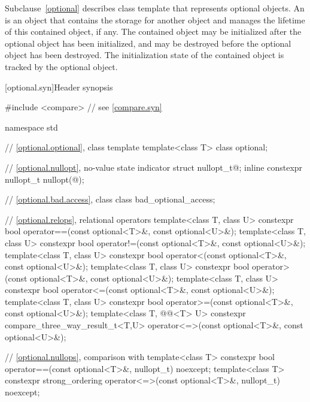 \pnum
Subclause~\ref{optional} describes class template  that represents
optional objects.
An  is an
object that contains the storage for another object and manages the lifetime of
this contained object, if any. The contained object may be initialized after
the optional object has been initialized, and may be destroyed before the
optional object has been destroyed. The initialization state of the contained
object is tracked by the optional object.

[optional.syn]{Header  synopsis}

%
\begin{codeblock}
#include <compare>              // see \ref{compare.syn}

namespace std {
  // \ref{optional.optional}, class template 
  template<class T>
    class optional;

  // \ref{optional.nullopt}, no-value state indicator
  struct nullopt_t{@\seebelow@};
  inline constexpr nullopt_t nullopt(@\unspec@);

  // \ref{optional.bad.access}, class 
  class bad_optional_access;

  // \ref{optional.relops}, relational operators
  template<class T, class U>
    constexpr bool operator==(const optional<T>&, const optional<U>&);
  template<class T, class U>
    constexpr bool operator!=(const optional<T>&, const optional<U>&);
  template<class T, class U>
    constexpr bool operator<(const optional<T>&, const optional<U>&);
  template<class T, class U>
    constexpr bool operator>(const optional<T>&, const optional<U>&);
  template<class T, class U>
    constexpr bool operator<=(const optional<T>&, const optional<U>&);
  template<class T, class U>
    constexpr bool operator>=(const optional<T>&, const optional<U>&);
  template<class T, @@<T> U>
    constexpr compare_three_way_result_t<T,U>
      operator<=>(const optional<T>&, const optional<U>&);

  // \ref{optional.nullops}, comparison with 
  template<class T> constexpr bool operator==(const optional<T>&, nullopt_t) noexcept;
  template<class T>
    constexpr strong_ordering operator<=>(const optional<T>&, nullopt_t) noexcept;

}
\end{codeblock}

